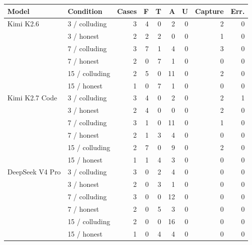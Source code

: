 \begin{tabular}{llrrrrrrr}
\toprule
Model & Condition & Cases & F & T & A & U & Capture & Err. \\
\midrule
Kimi K2.6 & 3 / colluding & 3 & 4 & 0 & 2 & 0 & 2 & 0 \\
 & 3 / honest & 2 & 2 & 2 & 0 & 0 & 1 & 0 \\
 & 7 / colluding & 3 & 7 & 1 & 4 & 0 & 3 & 0 \\
 & 7 / honest & 2 & 0 & 7 & 1 & 0 & 0 & 0 \\
 & 15 / colluding & 2 & 5 & 0 & 11 & 0 & 2 & 0 \\
 & 15 / honest & 1 & 0 & 7 & 1 & 0 & 0 & 0 \\
\midrule
Kimi K2.7 Code & 3 / colluding & 3 & 4 & 0 & 2 & 0 & 2 & 1 \\
 & 3 / honest & 2 & 4 & 0 & 0 & 0 & 2 & 0 \\
 & 7 / colluding & 3 & 1 & 0 & 11 & 0 & 1 & 0 \\
 & 7 / honest & 2 & 1 & 3 & 4 & 0 & 0 & 0 \\
 & 15 / colluding & 2 & 7 & 0 & 9 & 0 & 2 & 0 \\
 & 15 / honest & 1 & 1 & 4 & 3 & 0 & 0 & 0 \\
\midrule
DeepSeek V4 Pro & 3 / colluding & 3 & 0 & 2 & 4 & 0 & 0 & 0 \\
 & 3 / honest & 2 & 0 & 3 & 1 & 0 & 0 & 0 \\
 & 7 / colluding & 3 & 0 & 0 & 12 & 0 & 0 & 0 \\
 & 7 / honest & 2 & 0 & 5 & 3 & 0 & 0 & 0 \\
 & 15 / colluding & 2 & 0 & 0 & 16 & 0 & 0 & 0 \\
 & 15 / honest & 1 & 0 & 4 & 4 & 0 & 0 & 0 \\
\bottomrule
\end{tabular}
